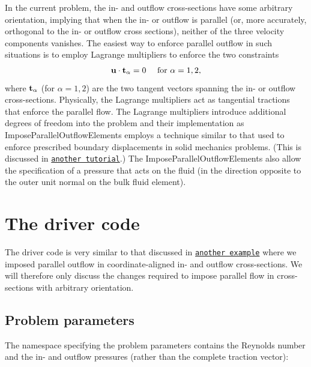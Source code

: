 In the current problem, the in-\/ and outflow cross-\/sections have some arbitrary orientation, implying that when the in-\/ or outflow is parallel (or, more accurately, orthogonal to the in-\/ or outflow cross sections), neither of the three velocity components vanishes. The easiest way to enforce parallel outflow in such situations is to employ Lagrange multipliers to enforce the two constraints \[ {\bf u} \cdot {\bf t}_\alpha = 0 \mbox{\ \ \ \ for $\alpha = 1,2$,} \] where $ {\bf t}_\alpha $ (for $\alpha = 1,2$) are the two tangent vectors spanning the in-\/ or outflow cross-\/sections. Physically, the Lagrange multipliers act as tangential tractions that enforce the parallel flow. The Lagrange multipliers introduce additional degrees of freedom into the problem and their implementation as {\ttfamily Impose\+Parallel\+Outflow\+Elements} employs a technique similar to that used to enforce prescribed boundary displacements in solid mechanics problems. (This is discussed in \href{../../../solid/prescribed_displ_lagr_mult/html/index.html}{\tt another tutorial}.) The {\ttfamily Impose\+Parallel\+Outflow\+Elements} also allow the specification of a pressure that acts on the fluid (in the direction opposite to the outer unit normal on the bulk fluid element).



 

\hypertarget{index_driver_code}{}\section{The driver code}\label{index_driver_code}
The driver code is very similar to that discussed in \href{../../unstructured_three_d_fluid/html/index.html}{\tt another example} where we imposed parallel outflow in coordinate-\/aligned in-\/ and outflow cross-\/sections. We will therefore only discuss the changes required to impose parallel flow in cross-\/sections with arbitrary orientation.



\hypertarget{index_namespace}{}\subsection{Problem parameters}\label{index_namespace}
The namespace specifying the problem parameters contains the Reynolds number and the in-\/ and outflow pressures (rather than the complete traction vector)\+:

